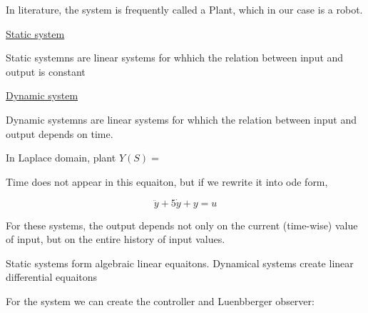 In literature, the system is frequently called a Plant, which in our case is a robot. 

\underline{Static system} 

Static systemns are linear systems for whhich the relation between input and output is constant

\underline{Dynamic system} 

Dynamic systemns are linear systems for whhich the relation between input and output depends on time. 

In Laplace domain,  plant 
$Y(S) = $

Time does not appear in this equaiton, but if we rewrite it into ode form,

\[\ddot y + 5\dot y + y = u\]

For these systems, the output depends not only on the current (time-wise) value of input, but on the entire history of input values.


Static systems form algebraic linear equaitons. Dynamical systems create linear differential equaitons


For the system we can create the controller and Luenbberger observer:


\[\]